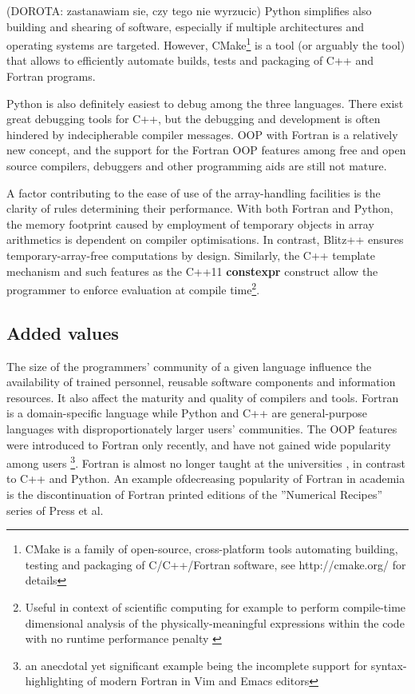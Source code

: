 \documentclass[final,5p,times,twocolumn]{elsarticle}
\newcommand{\prog}[1]{{\rm\bf#1}}
\begin{document}
(DOROTA: zastanawiam sie, czy tego nie wyrzucic)
  Python simplifies also building and shearing of software,
    especially if multiple architectures and operating systems are targeted.
  However, CMake\footnote{CMake is a family of open-source, cross-platform
    tools automating building, testing and packaging of C/C++/Fortran software,
    see http://cmake.org/ for details}
    is a tool (or arguably the tool) that allows to efficiently automate 
    builds, tests and packaging of C++ and Fortran programs.

  Python is also definitely easiest to debug among the three languages.
  There exist great debugging tools for C++, but the debugging and development is 
    often hindered by indecipherable compiler messages.
  OOP with Fortran is a relatively new concept, and the support for the Fortran OOP
    features among free and open source compilers, debuggers and other programming
    aids are still not mature.
    
  A factor contributing to the ease of use of the array-handling 
    facilities is the clarity of rules determining their performance.
  With both Fortran and Python, the memory footprint caused by employment
    of temporary objects in array arithmetics is dependent on compiler optimisations.
  In contrast, Blitz++ ensures temporary-array-free computations by design.
  Similarly, the C++ template mechanism and such features as the C++11
    \prog{constexpr} construct allow the programmer to enforce evaluation
    at compile time\footnote{Useful in context of scientific computing for example to perform
    compile-time dimensional analysis of the physically-meaningful expressions within
    the code with no runtime performance penalty \citet{Schabel_et_al_2008}}.

  \subsection{Added values}

  The size of the programmers' community of a given language 
    influence the availability of trained personnel, 
   reusable software components and information resources.
    It also affect the maturity and quality of compilers and tools. 
  Fortran is a domain-specific language while Python and C++ are general-purpose languages
    with disproportionately larger users' communities.
  The OOP features were introduced to Fortran only recently, and have not gained
    wide popularity among users \citep{Worth_2008}\footnote{an anecdotal yet significant
    example being the incomplete support for syntax-highlighting of modern Fortran in Vim and Emacs editors}.
  Fortran is almost no longer taught at the universities \citep{Kendall_et_al_2008},
    in contrast to C++ and Python.
  An example ofdecreasing popularity of Fortran in academia 
    is the discontinuation of Fortran printed editions of the ''Numerical Recipes'' 
    series of Press et al.
 
\end{document}
